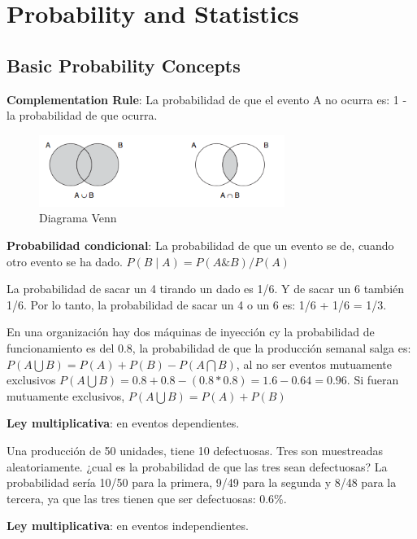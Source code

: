 \documentclass[]{article}
\begin{document}
\section{Probability and Statistics}

\subsection{Basic Probability Concepts}

\textbf{Complementation Rule}: La probabilidad de que el evento A no ocurra es: 1 - la probabilidad de que ocurra. 

\begin{figure}[ht!]
	\centering
	\includegraphics[width=80mm]{imagenes/DiagramaVenn.png}
	\caption{Diagrama Venn}
	\label{fig:DiagramaVenn}
\end{figure}

\textbf{Probabilidad condicional}: La probabilidad de que un evento se de, cuando otro evento se ha dado. $P(B\mid A) = P(A \& B)/P(A)$

La probabilidad de sacar un 4 tirando un dado es 1/6. Y de sacar un 6 también 1/6. Por lo tanto, la probabilidad de sacar un 4 o un 6 es: 1/6 + 1/6 = 1/3.

En una organización hay dos máquinas de inyección cy la probabilidad de funcionamiento es del 0.8, la probabilidad de que la producción semanal salga es: \newline 
$P(A \bigcup B) = P(A) + P(B) - P(A \bigcap B)$, al no ser eventos mutuamente exclusivos \newline $P(A \bigcup B) = 0.8 + 0.8 - (0.8 * 0.8) = 1.6 - 0.64 = 0.96$. \newline Si fueran mutuamente exclusivos, $P(A \bigcup B) = P(A) + P(B)$

\textbf{Ley multiplicativa}: en eventos dependientes.

Una producción de 50 unidades, tiene 10 defectuosas. Tres son muestreadas aleatoriamente. ¿cual es la probabilidad de que las tres sean defectuosas?
La probabilidad sería 10/50 para la primera, 9/49 para la segunda y 8/48 para la tercera, ya que las tres tienen que ser defectuosas: 0.6\%.

\textbf{Ley multiplicativa}: en eventos independientes.
\end{document}
